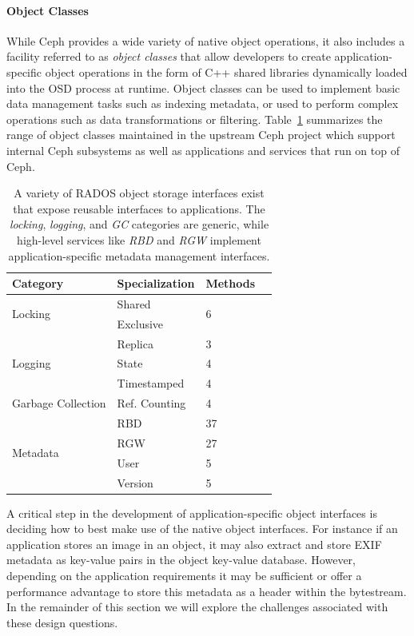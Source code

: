 \documentclass[10pt,twocolumn]{article}
\begin{document}
\paragraph*{Object Classes}
While Ceph provides a wide variety of native object operations, it also
includes a facility referred to as \emph{object classes} that allow developers
to create application-specific object operations in the form of C++ shared
libraries dynamically loaded into the OSD process at runtime.  Object classes
can be used to implement basic data management tasks such as indexing
metadata, or used to perform complex operations such as data transformations
or filtering. Table~\ref{tab:objclass-cats} summarizes the range of object
classes maintained in the upstream Ceph project which support internal Ceph
subsystems as well as applications and services that run on top of Ceph.

\begin{table}[ht]
\centering
\begin{tabularx}{\columnwidth}{|X|l|l|l|}
\hline
Category & Specialization & Methods \\ \hline
\multirow{2}{*}{Locking} & Shared & \multirow{2}{*}{6} \\
                         & Exclusive & \\ \hline
\multirow{3}{*}{Logging} & Replica & 3 \\
                         & State & 4 \\
                         & Timestamped & 4 \\ \hline
Garbage Collection & Ref. Counting & 4 \\ \hline
\multirow{4}{*}{Metadata} & RBD & 37 \\
 & RGW & 27 \\
 & User & 5 \\
 & Version & 5 \\ \hline
\end{tabularx}
\caption{A variety of RADOS object storage interfaces exist that expose reusable
    interfaces to applications. The \emph{locking}, \emph{logging}, and
    \emph{GC} categories are generic, while high-level services like \emph{RBD} and
    \emph{RGW} implement application-specific metadata management interfaces.}
\label{tab:objclass-cats}
\end{table}

A critical step in the development of application-specific object interfaces
is deciding how to best make use of the native object interfaces. For instance
if an application stores an image in an object, it may also extract and store
EXIF metadata as key-value pairs in the object key-value database.  However,
depending on the application requirements it may be sufficient or offer a performance
advantage to store this metadata as a header within the bytestream. In the remainder
of this section we will explore the challenges associated with these design questions.
\end{document}
